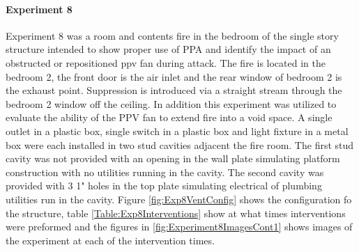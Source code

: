 \documentclass{article}
\begin{document}
\paragraph{Experiment 8}\mbox{}

Experiment 8 was a room and contents fire in the bedroom of the single story structure intended to show proper use of PPA and identify the impact of an obstructed or repositioned ppv fan during attack. The fire is located in the bedroom 2, the front door is the air inlet and the rear window of bedroom 2 is the exhaust point. Suppression is introduced via a straight stream through the bedroom 2 window off the ceiling. In addition this experiment was utilized to evaluate the ability of the PPV fan to extend fire into a void space. A single outlet in a plastic box, single switch in a plastic box and light fixture in a metal box were each installed in two stud cavities adjacent the fire room. The first stud cavity was not provided with an opening in the wall plate simulating platform construction with no utilities running in the cavity. The second cavity was provided with 3 1" holes in the top plate simulating electrical of plumbing utilities run in the cavity. Figure \ref{fig:Exp8VentConfig} shows the configuration fo the structure, table \ref{Table:Exp8Interventions} show at what times interventions were preformed and the figures in \ref{fig:Experiment8ImagesCont1} shows images of the experiment at each of the intervention times.
\end{document}
